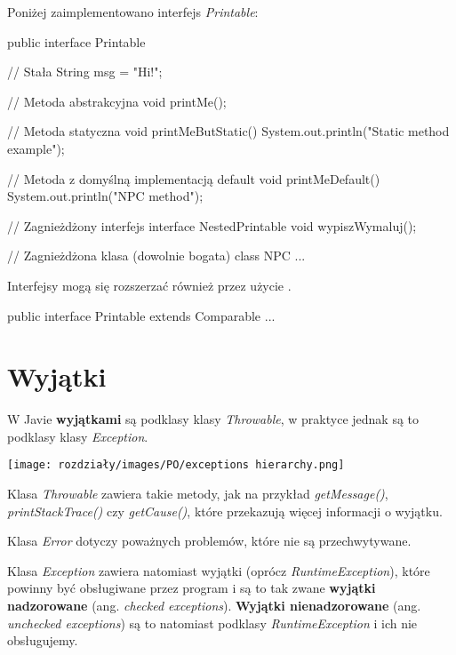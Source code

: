 \begin{example}
    Poniżej zaimplementowano interfejs \textit{Printable}:
    \begin{java}
        public interface Printable {
    
            // Stała
            String msg = "Hi!";
    
            // Metoda abstrakcyjna
            void printMe();
    
            // Metoda statyczna
            void printMeButStatic() {
                System.out.println("Static method example");
            }
    
            // Metoda z domyślną implementacją
            default void printMeDefault() {
                System.out.println("NPC method");
            }
    
            // Zagnieżdżony interfejs
            interface NestedPrintable {
                void wypiszWymaluj();
            }
    
            // Zagnieżdżona klasa (dowolnie bogata)
            class NPC { ... }
        }
    \end{java}
\end{example}

Interfejsy mogą się rozszerzać również przez użycie .
\begin{java}
    public interface Printable extends Comparable { ... }
\end{java}

\section{Wyjątki}

W Javie \textbf{wyjątkami} są podklasy klasy \textit{Throwable}, w praktyce jednak są to podklasy klasy \textit{Exception}.

\begin{center}
    \texttt{[image: rozdziały/images/PO/exceptions hierarchy.png]}
\end{center}

Klasa \textit{Throwable} zawiera takie metody, jak na przykład \textit{getMessage()}, \textit{printStackTrace()} czy \textit{getCause()}, które przekazują więcej informacji o wyjątku.

Klasa \textit{Error} dotyczy poważnych problemów, które nie są przechwytywane. 

Klasa \textit{Exception} zawiera natomiast wyjątki (oprócz \textit{RuntimeException}), które powinny być obsługiwane przez program i są to tak zwane \textbf{wyjątki nadzorowane} (ang. \textit{checked exceptions}). \textbf{Wyjątki nienadzorowane} (ang. \textit{unchecked exceptions}) są to natomiast podklasy \textit{RuntimeException} i ich nie obsługujemy.

